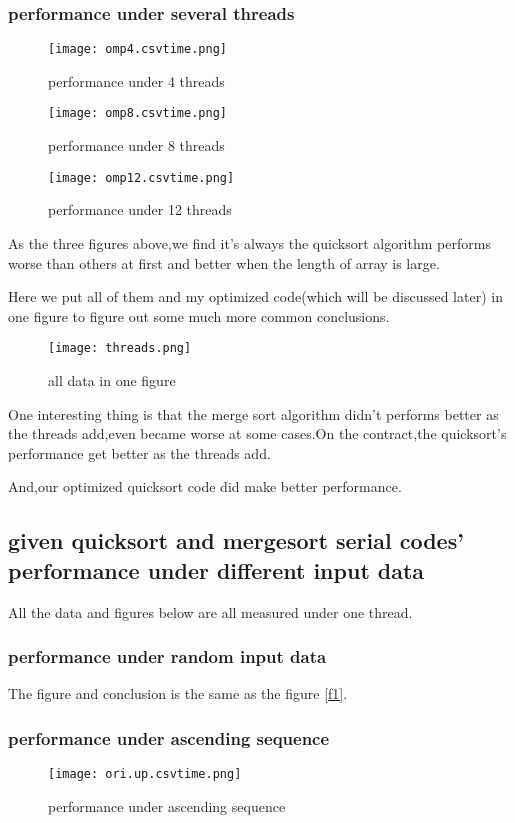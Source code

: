 \documentclass[11pt]{scrartcl} %
\begin{document}
	\subsubsection{performance under several threads }
	\begin{figure}[H]
		\centering
		\texttt{[image: omp4.csvtime.png]}
		\caption{performance under 4 threads}
		\label{}
	\end{figure}
	\begin{figure}[H]
		\centering
		\texttt{[image: omp8.csvtime.png]}
		\caption{performance under 8 threads}
		\label{}
	\end{figure}
	\begin{figure}[H]
		\centering
		\texttt{[image: omp12.csvtime.png]}
		\caption{performance under 12 threads}
		\label{}
	\end{figure}
	As the three figures above,we find it's always the quicksort algorithm performs worse than others at first and better when the length of array is large.

	Here we put all of them and my optimized code(which will be discussed later) in one figure to figure out some much more common conclusions.
	\begin{figure}[H]
		\centering
		\texttt{[image: threads.png]}
		\caption{all data in one figure}
		\label{}
	\end{figure}
	One interesting thing is that the merge sort algorithm didn't performs better as the threads add,even became worse at some cases.On the contract,the quicksort's performance get better as the threads add.

	And,our optimized quicksort code did make better performance.
	\subsection{given quicksort and mergesort serial codes' performance under different input data}
	All the data and figures below are all measured under one thread.
	\subsubsection{performance under random input data }
	The figure and conclusion is the same as the figure \ref{f1}.
	\subsubsection{performance under ascending sequence }
	\begin{figure}[H]
		\centering
		\texttt{[image: ori.up.csvtime.png]}
		\caption{performance under ascending sequence}
		\label{}
	\end{figure}
\end{document}
